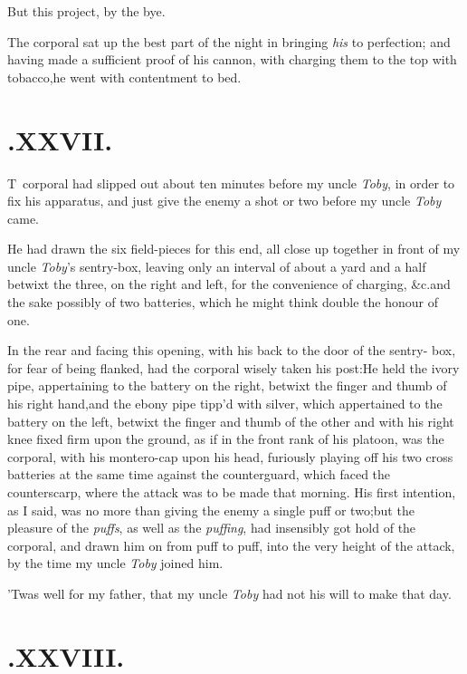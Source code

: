 \documentclass{article}
\begin{document}
\tsh But this project, by the bye.

The corporal sat up the best part of the night in bringing
\textit{his} to perfection; and having made a sufficient proof of his cannon,
with charging them to the top with tobacco,\tsk he went with
contentment to bed.

\enlargethispage{2\baselineskip}
\section{.\enspace XXVII.}

\lettrine{T}{\,} corporal had slipped out about
ten minutes before my uncle \textit{Toby}, in order to fix his
apparatus, and just give the enemy a shot or two before my uncle
\textit{Toby} came.

He had drawn the six field-pieces for this end, all close up
together in front of my uncle \textit{Toby}’s sentry-box,
leaving only an interval of about a yard and a half betwixt the
three, on the right and left, for the convenience of charging,
\&c.\tsk and the sake possibly of two batteries, which he
might think double the honour of one.

In the rear and facing this opening, with his back to the door
of the sentry- box, for fear of being flanked, had the corporal
wisely taken his post:\tsh He held the ivory pipe, appertaining to the battery on
the right, betwixt the finger and thumb of his right
hand,\tsk and the ebony pipe tipp’d with silver, which
appertained to the battery on the left, betwixt the finger and
thumb of the other\break
\tsh and with his right knee fixed firm
upon the ground, as if in the front rank of his platoon, was the
corporal, with his montero-cap upon his head, furiously playing off
his two cross batteries at the same time against the counterguard,
which faced the counterscarp, where the attack was to be made that
morning.\break
His first intention, as I said, was no more than giving
the enemy a single puff or two;\tsk but the pleasure of the
\textit{puffs}, as well as the \textit{puffing}, had insensibly got
hold of the corporal, and drawn him on from puff to puff, into the
very height of the attack, by the time my uncle \textit{Toby} joined
him.

’Twas well for my father, that my uncle \textit{Toby} had
not his will to make that day.

\section{.\enspace XXVIII.}
\end{document}
